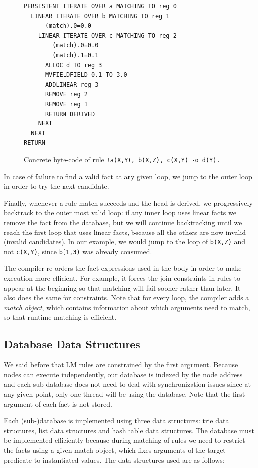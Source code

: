 \begin{figure}[h]
\begin{Verbatim}
PERSISTENT ITERATE OVER a MATCHING TO reg 0
  LINEAR ITERATE OVER b MATCHING TO reg 1
      (match).0=0.0
    LINEAR ITERATE OVER c MATCHING TO reg 2
        (match).0=0.0
        (match).1=0.1
      ALLOC d TO reg 3
      MVFIELDFIELD 0.1 TO 3.0
      ADDLINEAR reg 3
      REMOVE reg 2
      REMOVE reg 1
      RETURN DERIVED
    NEXT
  NEXT
RETURN
\end{Verbatim}
\caption{Concrete byte-code of rule \texttt{!a(X,Y), b(X,Z), c(X,Y) -o d(Y).}}
\label{fig:byte_code}
\end{figure}

In case of failure to find a valid fact at any given loop, we jump
to the outer loop in order to try the next candidate.

Finally, whenever a rule match succeeds and the head is derived, we progressively backtrack to the outer most valid loop:
if any inner loop uses linear facts we remove the fact from the database, but we will
continue backtracking until we reach the first loop that uses linear facts,
because all the others are now invalid (invalid candidates). In our example, we would jump to the
loop of \texttt{b(X,Z)} and not \texttt{c(X,Y)}, since \texttt{b(1,3)} was already consumed.

The compiler re-orders the fact expressions used in the body in order to make execution more
efficient. For example, it forces the join constraints in rules to appear at the beginning so
that matching will fail sooner rather than later. It also does the same for constraints.
Note that for every loop, the compiler adds a \emph{match object}, which contains information
about which arguments need to match, so that runtime matching is efficient.

\subsection{Database Data Structures}

We said before that LM rules are constrained by the first argument. Because nodes can execute
independently, our database is indexed by the node address and each sub-database does not
need to deal with synchronization issues since at any given point, only one thread will be using
the database. Note that the first argument of each fact is not stored.

Each (sub-)database is implemented using three data structures: trie data structures, list data structures and hash table data structures.
The database must be implemented efficiently because during matching of rules we need
to restrict the facts using a given match object, which fixes arguments of the target predicate to instantiated values. The data structures used are as follows:


